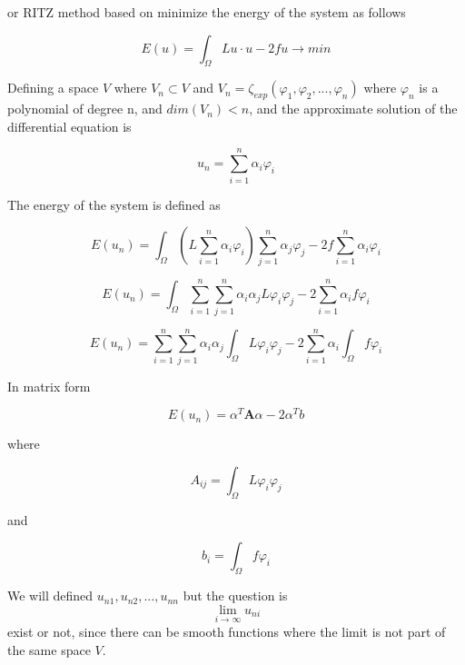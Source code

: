 or RITZ method based on minimize the energy of the system as follows

\begin{equation}
E(u) = \int_{\Omega} Lu\cdot u - 2fu  \rightarrow min
\end{equation}

Defining a space $V$ where  $V_n \subset V$ and $V_n = \zeta_{exp}(\varphi_1, \varphi_2, ..., \varphi_n)$ where $\varphi_n$ is a polynomial of degree n, and $dim(V_n) < n$, and the approximate solution of the differential equation is 

\begin{equation}
u_n = \sum_{i=1}^{n} \alpha_i \varphi_i
\end{equation}

The energy of the system is defined as

\begin{equation}
E(u_n) = \int_{\Omega}\left(  L \sum_{i=1}^{n} \alpha_i \varphi_i\right)  \sum_{j=1}^{n} \alpha_j\varphi_j - 2f  \sum_{i=1}^{n} \alpha_i \varphi_i 
\end{equation}

\begin{equation}
E(u_n) = \int_{\Omega}  \sum_{i=1}^{n} \sum_{j=1}^{n}  \alpha_i  \alpha_j L  \varphi_i \varphi_j - 2 \sum_{i=1}^{n} \alpha_i f \varphi_i 
\end{equation}

\begin{equation}
E(u_n) =  \sum_{i=1}^{n} \sum_{j=1}^{n}  \alpha_i  \alpha_j \int_{\Omega}   L \varphi_i \varphi_j - 2 \sum_{i=1}^{n} \alpha_i \int_{\Omega}  f \varphi_i 
\end{equation}

In matrix form

\begin{equation}
E(u_n) = \alpha^T \mathbf{A} \alpha - 2 \alpha^T b
\end{equation}

where 

\begin{equation}
A_{ij} = \int_{\Omega}   L \varphi_i \varphi_j 
\end{equation}
 
 and 
 
 \begin{equation}
 b_{i} = \int_{\Omega}  f \varphi_i
 \end{equation}


We will defined $u_{n1}, u_{n2}, ..., u_{nn}$ but the question is $$\lim_{i\to\infty }u_{ni}$$ exist or not, since there can be smooth functions where the limit is not part of the same space $V$. 

